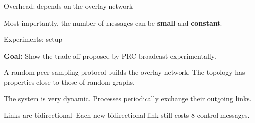 \documentclass[10pt, xcolor={usenames, dvipsnames}]{beamer}
\begin{document}
\begin{frame}{Overhead: depends on the overlay network}

  \begin{table}
    \begin{center}
      
    \end{center}
  \end{table}
  
  \vspace{1em}
  
  \begin{center}
    
  \end{center}


  \begin{center}
    \begin{table}
      \begin{center}
        
      \end{center}
    \end{table}
  \end{center}
  
  \vspace{1em}

  Most importantly, the number of messages can be \textbf{small} and
  \textbf{constant}.


\end{frame}


\begin{frame}{Experiments: setup}
  
  \textbf{Goal:} Show the trade-off proposed by PRC-broadcast experimentally.

  \vspace{1em}

  A random peer-sampling protocol builds the overlay network. The topology has
  properties close to those of random graphs.

  \vspace{1em}
  
  The system is very dynamic. Processes periodically exchange their outgoing
  links.
  
  \vspace{1em}
  
  Links are bidirectional. Each new bidirectional link still costs 8 control
  messages.
  
  
  
  
\end{frame}
\end{document}
